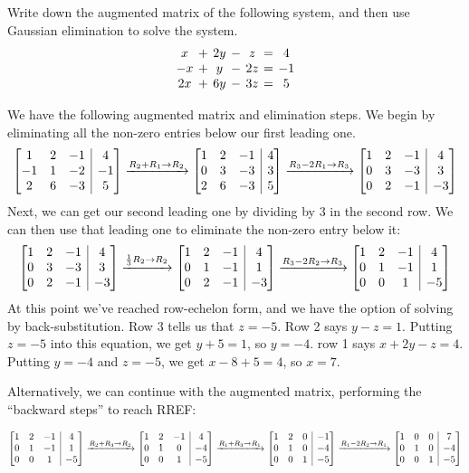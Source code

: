 \documentclass[12pt]{exam}
\makeatletter
\newenvironment{amatrix}[1]{%
  \left[\begin{array}{@{}*{#1}{c}|c@{}}
}{%
  \end{array}\right]
}
\newcommand{\bam}{\begin{amatrix}}
\newcommand{\eam}{\end{amatrix}}
\makeatother
\begin{document}
\begin{questions}
\question Write down the augmented matrix of the following system, and then use Gaussian elimination to solve the system.
\[
 \arraycolsep=2pt \begin{array}{ccccccc}
                  x&+&2y&-&z&=&4\\-x&+&y&-&2z&=&-1\\ 2x&+&6y&-&3z&=&5
                  \end{array}
\]
\begin{solution}[10cm]
We have the following augmented matrix and elimination steps. We begin by eliminating all the non-zero entries below our first leading one.
\[
\bam{3}
1&2&-1&4\\
-1&1&-2&-1\\
2&6&-3&5
\eam  \xrightarrow[]{R_2+R_1\to R_2}
\bam{3}
 1&2&-1&4\\
 0&3&-3&3\\
 2&6&-3&5
\eam
 \xrightarrow[]{R_3-2R_1\to R_3} 
\bam{3}
 1&2&-1&4\\
 0&3&-3&3\\
 0&2&-1&-3
\eam
\]
Next, we can get our second leading one by dividing by 3 in the second row. We can then use that leading one to eliminate the non-zero entry below it:
\[
\bam{3}
 1&2&-1&4\\
 0&3&-3&3\\
 0&2&-1&-3
\eam
\xrightarrow[]{\frac13 R_2\to R_2}
\bam{3}
 1&2&-1&4\\
 0&1&-1&1\\
 0&2&-1&-3
\eam 
\xrightarrow[]{R_3-2R_2\to R_3}
\bam{3}
 1&2&-1&4\\
 0&1&-1&1\\
 0&0&1&-5
\eam
\]
At this point we've reached row-echelon form, and we have the option of solving by back-substitution. Row 3 tells us that $z=-5$. Row 2 says $y-z=1$. Putting $z=-5$ into this equation, we get $y+5=1$, so $y=-4$. row 1 says $x+2y-z=4$. Putting $y=-4$ and $z=-5$, we get $x-8+5=4$, so $x=7$.



Alternatively, we can continue with the augmented matrix, performing the ``backward steps'' to reach RREF:

\noindent\hskip -60pt
\noindent\begin{minipage}{1.2\textwidth}
\[
\bam{3}
 1&2&-1&4\\
 0&1&-1&1\\
 0&0&1&-5
\eam  \xrightarrow[]{R_2+R_3\to R_2} 
\bam{3}
 1&2&-1&4\\
 0&1&0&-4\\
 0&0&1&-5
\eam
\xrightarrow[]{R_1+R_3\to R_1} 
\bam{3}
 1&2&0&-1\\
 0&1&0&-4\\
 0&0&1&-5
\eam
\xrightarrow[]{R_1-2R_2\to R_1}
\bam{3}
 1&0&0&7\\
 0&1&0&-4\\
 0&0&1&-5
\eam 
\]
\end{minipage}


\end{solution}
\end{questions}
\end{document}
